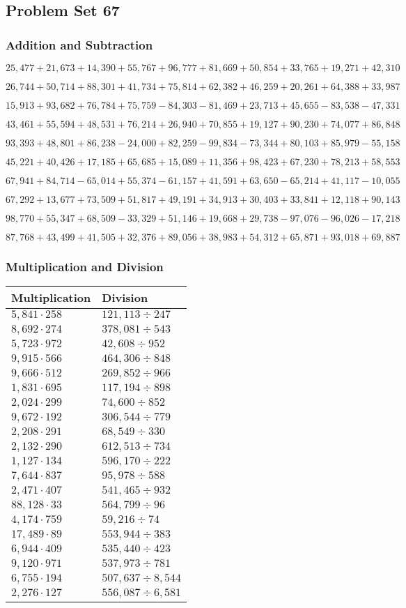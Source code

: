 \hypertarget{problem-set-67}{%
\subsection{Problem Set 67}\label{problem-set-67}}

\hypertarget{addition-and-subtraction-289}{%
\subsubsection{Addition and
Subtraction}\label{addition-and-subtraction-289}}

\(25,477+21,673+14,390+55,767+96,777+81,669+50,854+33,765+19,271+ 42,310\)

\(26,744+50,714+88,301+41,734+75,814+62,382+46,259+20,261+64,388+33,987\)

\(15,913+93,682+76,784+75,759-84,303-81,469+23,713+45,655-83,538-47,331\)

\(43,461+55,594+48,531+76,214+26,940+70,855+19,127+90,230+74,077+86,848\)

\(93,393+48,801+86,238-24,000+82,259-99,834-73,344+80,103+85,979-55,158\)

\(45,221+40,426+17,185+65,685+15,089+11,356+98,423+67,230+78,213+58,553\)

\(67,941+84,714-65,014+55,374-61,157+41,591+63,650-65,214+41,117-10,055\)

\(67,292+13,677+73,509+51,817+49,191+34,913+30,403+33,841+12,118+90,143\)

\(98,770+55,347+68,509-33,329+51,146+19,668+29,738-97,076-96,026-17,218\)

\(87,768+43,499+41,505+32,376+89,056+38,983+54,312+65,871+93,018+69,887\)

\hypertarget{multiplication-and-division-288}{%
\subsubsection{Multiplication and
Division}\label{multiplication-and-division-288}}

\begin{longtable}[]{@{}ll@{}}
\toprule
Multiplication & Division\tabularnewline
\midrule
\endhead
\(5,841\cdot258\) & \(121,113÷247\)\tabularnewline
\(8,692\cdot274\) & \(378,081÷543\)\tabularnewline
\(5,723\cdot972\) & \(42,608÷952\)\tabularnewline
\(9,915\cdot566\) & \(464,306÷848\)\tabularnewline
\(9,666\cdot512\) & \(269,852÷966\)\tabularnewline
\(1,831\cdot695\) & \(117,194÷898\)\tabularnewline
\(2,024\cdot299\) & \(74,600÷852\)\tabularnewline
\(9,672\cdot192\) & \(306,544÷779\)\tabularnewline
\(2,208\cdot291\) & \(68,549÷330\)\tabularnewline
\(2,132\cdot290\) & \(612,513÷734\)\tabularnewline
\(1,127\cdot134\) & \(596,170÷222\)\tabularnewline
\(7,644\cdot837\) & \(95,978÷588\)\tabularnewline
\(2,471\cdot407\) & \(541,465÷932\)\tabularnewline
\(88,128\cdot33\) & \(564,799÷96\)\tabularnewline
\(4,174\cdot759\) & \(59,216÷74\)\tabularnewline
\(17,489\cdot89\) & \(553,944÷383\)\tabularnewline
\(6,944\cdot409\) & \(535,440÷423\)\tabularnewline
\(9,120\cdot971\) & \(537,973÷781\)\tabularnewline
\(6,755\cdot194\) & \(507,637÷8,544\)\tabularnewline
\(2,276\cdot127\) & \(556,087÷6,581\)\tabularnewline
\bottomrule
\end{longtable}

